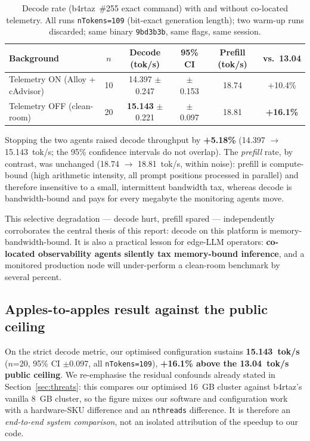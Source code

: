 \documentclass[10pt,a4paper]{article}
\begin{document}
\begin{table}[H]
\centering
\caption{Decode rate (b4rtaz~\#255 exact command) with and without co-located telemetry. All runs \texttt{nTokens=109} (bit-exact generation length); two warm-up runs discarded; same binary \texttt{9bd3b3b}, same flags, same session.}
\label{tab:telemetry}
\begin{tabular}{lccccc}
\toprule
\textbf{Background} & \textbf{$n$} & \textbf{Decode (tok/s)} & \textbf{95\% CI} & \textbf{Prefill (tok/s)} & \textbf{vs.\ 13.04} \\
\midrule
Telemetry ON (Alloy + cAdvisor)  & 10 & 14.397 $\pm$ 0.247 & $\pm$0.153 & 18.74 & +10.4\% \\
Telemetry OFF (clean-room)       & 20 & \textbf{15.143} $\pm$ 0.221 & $\pm$0.097 & 18.81 & \textbf{+16.1\%} \\
\bottomrule
\end{tabular}
\end{table}

Stopping the two agents raised decode throughput by \textbf{+5.18\%} (14.397 $\to$ 15.143~tok/s; the 95\% confidence intervals do not overlap). The \emph{prefill} rate, by contrast, was unchanged (18.74 $\to$ 18.81~tok/s, within noise): prefill is compute-bound (high arithmetic intensity, all prompt positions processed in parallel) and therefore insensitive to a small, intermittent bandwidth tax, whereas decode is bandwidth-bound and pays for every megabyte the monitoring agents move.

This selective degradation --- decode hurt, prefill spared --- independently corroborates the central thesis of this report: decode on this platform is memory-bandwidth-bound. It is also a practical lesson for edge-LLM operators: \textbf{co-located observability agents silently tax memory-bound inference}, and a monitored production node will under-perform a clean-room benchmark by several percent.

\subsection{Apples-to-apples result against the public ceiling}
On the strict decode metric, our optimised configuration sustains \textbf{15.143~tok/s} ($n$=20, 95\% CI $\pm$0.097, all \texttt{nTokens=109}), \textbf{+16.1\% above the 13.04~tok/s public ceiling}. We re-emphasise the residual confounds already stated in Section~\ref{sec:threats}: this compares our optimised 16~GB cluster against b4rtaz's vanilla 8~GB cluster, so the figure mixes our software and configuration work with a hardware-SKU difference and an \texttt{nthreads} difference. It is therefore an \emph{end-to-end system comparison}, not an isolated attribution of the speedup to our code.
\end{document}
